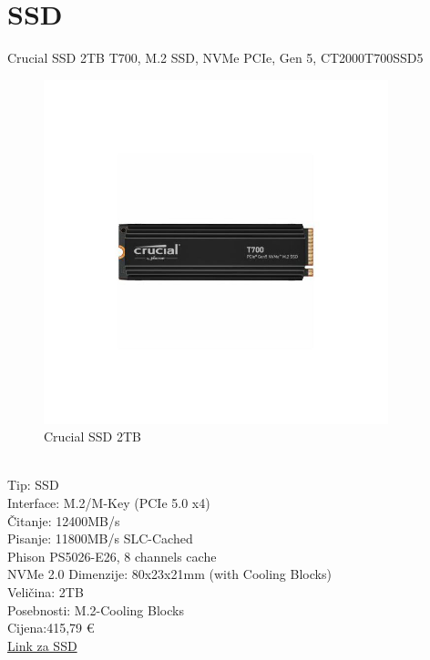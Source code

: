 \documentclass{article}
\begin{document}
\section{SSD}
Crucial SSD 2TB T700, M.2 SSD, NVMe PCIe, Gen 5, CT2000T700SSD5
\begin{figure}[h]
    \includegraphics[width=10cm]{ssd.jpg}
    \caption{Crucial SSD 2TB}
\end{figure}\\
Tip: SSD\\
Interface: M.2/M-Key (PCIe 5.0 x4)\\
Čitanje: 12400MB/s\\
Pisanje: 11800MB/s SLC-Cached\\
Phison PS5026-E26, 8 channels cache\\
NVMe 2.0
Dimenzije: 80x23x21mm (with Cooling Blocks)\\
Veličina: 2TB\\
Posebnosti: M.2-Cooling Blocks\\
Cijena:415,79 €\\
\href{https://www.adm.hr/crucial-ssd-2tb-t700-m2-ssd-nvme-pcie-gen-5-ct2000t700ssd5/79439/product/}{Link za SSD}
\newpage
\end{document}
